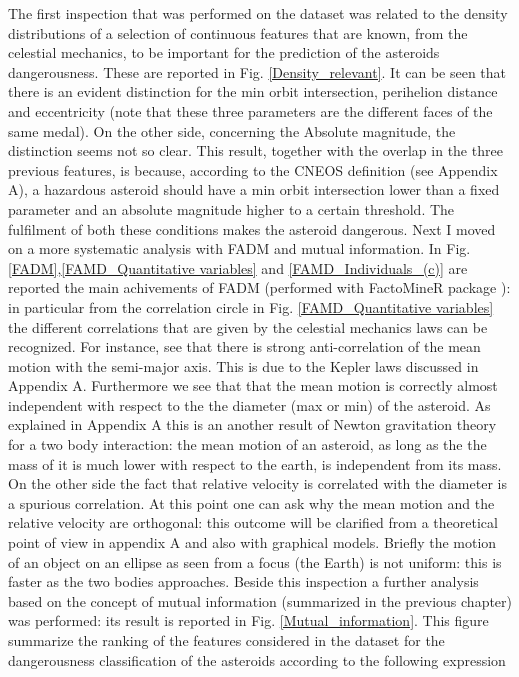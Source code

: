 \documentclass[12pt,%
               a4paper,%
               oneside,openany,%
               titlepage,%
               headinclude,footinclude,%
               BCOR5mm,%
               cleardoublepage=empty,%
               tablecaptionabove,%
               floatperchapter,
               ]{scrreprt}                 %
\begin{document}
The first inspection that was performed on the dataset was related to the density distributions of a selection of continuous features that are known, from the celestial mechanics, to be important for the prediction of the asteroids dangerousness. These are reported in Fig. \ref{Density_relevant}. It can be seen that there is an evident distinction for the min orbit intersection, perihelion distance and eccentricity (note that these three parameters are the different faces of the same medal). On the other side, concerning the Absolute magnitude, the distinction seems not so clear. This result, together with the overlap in the three previous features, is because, according to the CNEOS definition (see Appendix A), a hazardous asteroid should have a min orbit intersection lower than a fixed parameter and an absolute magnitude higher to a certain threshold. The fulfilment of both these conditions makes the asteroid dangerous. Next I moved on a more systematic analysis with FADM and mutual information. In Fig. \ref{FADM},\ref{FAMD_Quantitative variables} and \ref{FAMD_Individuals_(c)} are reported the main achivements of FADM (performed with FactoMineR package \cite{le2008factominer}): in particular from the correlation circle in Fig. \ref{FAMD_Quantitative variables} the different correlations that are given by the celestial mechanics laws can be recognized. For instance, see that there is strong anti-correlation of the mean motion with the semi-major axis. This is due to the Kepler laws discussed in Appendix A. Furthermore we see that that the mean motion is correctly almost independent with respect to the the diameter (max or min) of  the asteroid. As explained in Appendix A this is an another result of Newton gravitation theory for a two body interaction: the mean motion of an asteroid, as long as the the mass of it is much lower with respect to the earth, is independent from its mass. On the other side the fact that relative velocity is correlated with the diameter is a spurious correlation. At this point one can ask why the mean motion and the relative velocity are orthogonal: this outcome will be clarified from a theoretical point of view in appendix A and also with graphical models. Briefly the motion of an object on an ellipse as seen from a focus (the Earth) is not uniform: this is faster as the two bodies approaches. Beside this inspection a further analysis based on the concept of mutual information (summarized in the previous chapter) was performed: its result is reported in Fig. \ref{Mutual_information}. This figure summarize the ranking of the features considered in the dataset for the dangerousness classification of the asteroids according to the following expression \cite{kratzer2018varrank}
\end{document}
